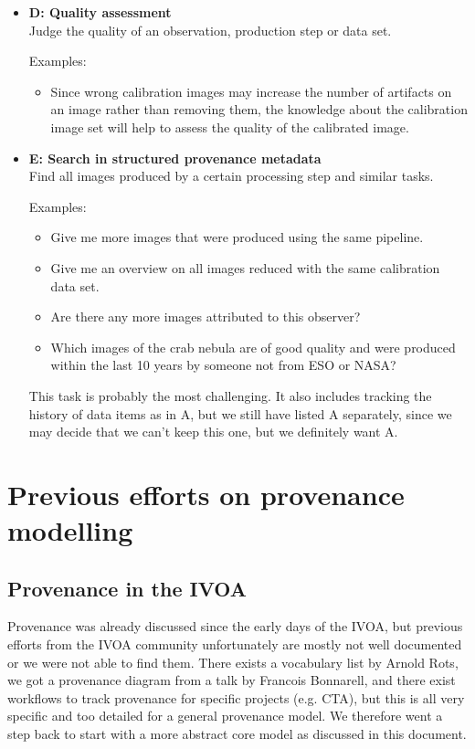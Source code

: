 \documentclass[11pt,a4paper]{ivoa}
\begin{document}
\begin{itemize}
	  

	\item   \textbf{D: Quality assessment}\\
		Judge the quality of an observation, production step or data set.
		
		Examples: 
		\begin{itemize}
			\item Since wrong calibration images may increase the
number of artifacts on an image rather than removing them, the knowledge about
the calibration image set will help to assess the quality of the calibrated
image.  
		\end{itemize}
	  

	\item   \textbf{E: Search in structured provenance metadata}\\
		Find all images produced by a certain processing step and similar tasks.
		
		Examples: 
		\begin{itemize}
			\item Give me more images that were produced using the
same pipeline.  
			\item Give me an overview on all images reduced with the same calibration data set.  
			\item Are there any more images attributed to this observer?  
			\item Which images of the crab nebula are of good quality and were produced within the last 10 years by someone not from ESO or NASA?  
		\end{itemize}

		This task is probably the most challenging. It also includes tracking the history of data items as in A, but we still have listed A separately, since we may decide that we can't keep this one, but we definitely want A.
	  
\end{itemize}


\section{Previous efforts on provenance modelling}
\subsection{Provenance in the IVOA}

Provenance was already discussed since the early days of the IVOA, but previous efforts from the IVOA community unfortunately are mostly not well documented or we were not able to find them. 
There exists a vocabulary list by Arnold Rots, we got a provenance diagram from a talk by Francois Bonnarell, and there exist workflows to track provenance for specific projects (e.g. CTA), but this is all very specific and too detailed for a general provenance model. We therefore went a step back to start with a more abstract core model as discussed in this document.
\end{document}
